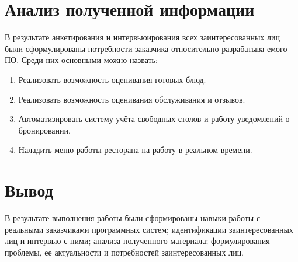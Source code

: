 \section{Анализ полученной информации}

В результате анкетирования и интервьюирования всех заинтересованных
лиц были сформулированы потребности заказчика относительно разрабатыва­
емого ПО.
Среди них основными можно назвать:

\begin{enumerate}
	\item{Реализовать возможность оценивания готовых блюд.}
	\item{Реализовать возможность оценивания обслуживания и отзывов.}
	\item{Автоматизировать систему учёта свободных столов и работу уведомлений о бронировании.­}
	\item{Наладить меню работы ресторана на работу в реальном времени.}
\end{enumerate}

\section{Вывод}

В результате выполнения работы были сформированы навыки работы с реальными заказчиками программных систем; идентификации заинтересованных лиц и интервью с ними; анализа полученного материала; формулирования проблемы, ее актуальности и потребностей заинтересованных лиц.

